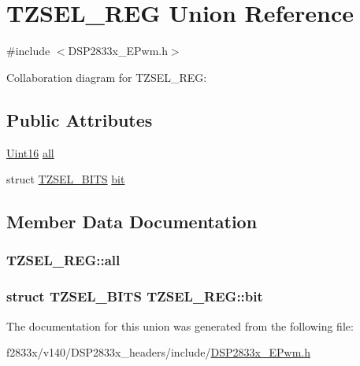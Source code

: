 \hypertarget{union_t_z_s_e_l___r_e_g}{}\section{T\+Z\+S\+E\+L\+\_\+\+R\+E\+G Union Reference}
\label{union_t_z_s_e_l___r_e_g}


{\ttfamily \#include $<$D\+S\+P2833x\+\_\+\+E\+Pwm.\+h$>$}



Collaboration diagram for T\+Z\+S\+E\+L\+\_\+\+R\+E\+G\+:
\subsection*{Public Attributes}
\begin{DoxyCompactItemize}
\item 
\hyperlink{_d_s_p2833x___device_8h_a59a9f6be4562c327cbfb4f7e8e18f08b}{Uint16} \hyperlink{union_t_z_s_e_l___r_e_g_a19d6114c4d665b48a08af1341787d6d8}{all}
\item 
struct \hyperlink{struct_t_z_s_e_l___b_i_t_s}{T\+Z\+S\+E\+L\+\_\+\+B\+I\+T\+S} \hyperlink{union_t_z_s_e_l___r_e_g_aac30c3b8dffbd33b50718880c7d53d68}{bit}
\end{DoxyCompactItemize}


\subsection{Member Data Documentation}
\hypertarget{union_t_z_s_e_l___r_e_g_a19d6114c4d665b48a08af1341787d6d8}{}
\subsubsection[{all}]{ T\+Z\+S\+E\+L\+\_\+\+R\+E\+G\+::all}\label{union_t_z_s_e_l___r_e_g_a19d6114c4d665b48a08af1341787d6d8}
\hypertarget{union_t_z_s_e_l___r_e_g_aac30c3b8dffbd33b50718880c7d53d68}{}
\subsubsection[{bit}]{\setlength{\rightskip}{0pt plus 5cm}struct {\bf T\+Z\+S\+E\+L\+\_\+\+B\+I\+T\+S} T\+Z\+S\+E\+L\+\_\+\+R\+E\+G\+::bit}\label{union_t_z_s_e_l___r_e_g_aac30c3b8dffbd33b50718880c7d53d68}


The documentation for this union was generated from the following file\+:\begin{DoxyCompactItemize}
\item 
f2833x/v140/\+D\+S\+P2833x\+\_\+headers/include/\hyperlink{_d_s_p2833x___e_pwm_8h}{D\+S\+P2833x\+\_\+\+E\+Pwm.\+h}\end{DoxyCompactItemize}
